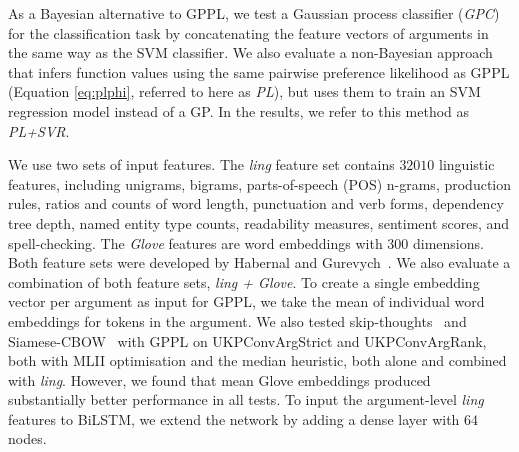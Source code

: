 



As a Bayesian alternative to GPPL, 
we test a Gaussian process classifier (\emph{GPC}) for the classification task 
by concatenating the feature vectors of arguments in the same way as the SVM classifier.
We also evaluate a non-Bayesian approach that infers function values using the 
same pairwise preference likelihood as GPPL
(Equation \ref{eq:plphi}, referred to here as \emph{PL}), 
but uses them to train an SVM regression model instead of a GP. 
In the results, we refer to this method as \emph{PL+SVR}.

We use two sets of input features. The \emph{ling} feature set contains $32010$ linguistic features,  
including unigrams, bigrams, parts-of-speech (POS) n-grams, production rules,
ratios and counts of word length, punctuation and verb forms,
dependency tree depth, named entity type counts,
readability measures, sentiment scores, and spell-checking.
The \emph{Glove} features are word embeddings with 300 dimensions. Both feature sets were
developed by Habernal and Gurevych~.
We also evaluate a combination of both feature sets, \emph{ling + Glove}.
To create a single embedding vector per argument as input for GPPL,
we take the mean of individual word embeddings for tokens in the argument.
We also tested skip-thoughts~\cite{kiros2015skip} and Siamese-CBOW~\cite{kenter2016siamesecbow} 
with GPPL on UKPConvArgStrict and UKPConvArgRank, both with MLII optimisation and the median heuristic,
 both alone and combined with \emph{ling}. 
However, we found that mean Glove embeddings produced substantially better performance in all tests.
To input the argument-level \emph{ling} features to BiLSTM, we extend the network by adding a dense layer with $64$ nodes. 

